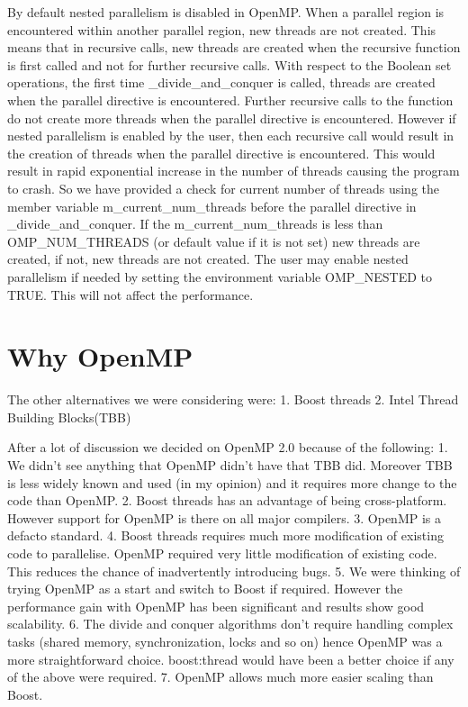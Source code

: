 By default nested parallelism is disabled in OpenMP. When a parallel region is encountered within another parallel region, new threads are not created. This means that in recursive calls, new threads are created when the recursive function is first called and not for further recursive calls. With respect to the Boolean set operations, the first time _divide_and_conquer is called, threads are created when the parallel directive is encountered. Further recursive calls to the function do not create more threads when the parallel directive is encountered. However if nested parallelism is enabled by the user, then each recursive call would result in the creation of threads when the parallel directive is encountered. This would result in rapid exponential increase in the number of threads causing the program to crash. So we have provided a check for current number of threads using the member variable m_current_num_threads before the parallel directive in _divide_and_conquer. If the m_current_num_threads is less than OMP_NUM_THREADS (or default value if it is not set) new threads are created, if not, new threads are not created.
The user may enable nested parallelism if needed by setting the environment variable OMP_NESTED to TRUE. This will not affect the performance.

\section{Why OpenMP\label{sec:why_openmp}}

The other alternatives we were considering were: 
1. Boost threads
2. Intel Thread Building Blocks(TBB) 

After a lot of discussion we decided on OpenMP 2.0 because of the following:
1. We didn't see anything that OpenMP didn't have that TBB did. Moreover TBB is less widely known and used (in my opinion) and it requires more change to the code than OpenMP.
2. Boost threads has an advantage of being cross-platform. However support for OpenMP is there on all major compilers.
3. OpenMP is a defacto standard.
4. Boost threads requires much more modification of existing code to parallelise. OpenMP required very little modification of existing code. This reduces the chance of inadvertently introducing bugs.
5. We were thinking of trying OpenMP as a start and switch to Boost if required. However the performance gain with OpenMP has been significant and results show good scalability.
6. The divide and conquer algorithms don't require handling complex tasks (shared memory, synchronization, locks and so on) hence OpenMP was a more straightforward choice. boost:thread would have been a better choice if any of the above were required.
7. OpenMP allows much more easier scaling than Boost.
